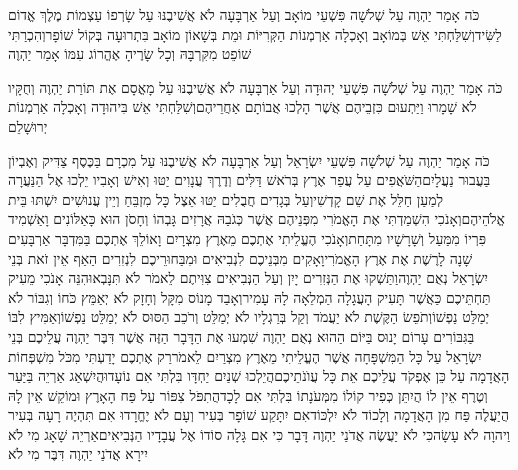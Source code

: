 \documentclass[../main/main.tex]{subfiles}
\begin{document}
\begin{multicols*}{\ncols}
כֹּה אָמַר יַהְוֶה עַל שְׁלֹשָׁה פִּשְׁעֵי מוֹאָב וְעַל אַרְבָּעָה לֹא אֲשִׁיבֶנּוּ עַל שָׂרְפוֹ עַצְמוֹת מֶלֶךְ אֱדוֹם לַשִּׂיד\PreVerseSpace{}וְשִׁלַּחְתִּי אֵשׁ בְּמוֹאָב וְאָכְלָה אַרְמְנוֹת הַקְּרִיּוֹת וּמֵת בְּשָׁאוֹן מוֹאָב בִּתְרוּעָה בְּקוֹל שׁוֹפָר\PreVerseSpace{}וְהִכְרַתִּי שׁוֹפֵט מִקִּרְבָּהּ וְכָל שָׂרֶיהָ אֶהֱרוֹג עִמּוֹ אָמַר יַהְוֶה\OpenSection{}\par
{}כֹּה אָמַר יַהְוֶה עַל שְׁלֹשָׁה פִּשְׁעֵי יְהוּדָה וְעַל אַרְבָּעָה לֹא אֲשִׁיבֶנּוּ עַל מָאֳסָם אֶת תּוֹרַת יַהְוֶה וְחֻקָּיו לֹא שָׁמָרוּ וַיַּתְעוּם כִּזְבֵיהֶם אֲשֶׁר הָלְכוּ אֲבוֹתָם אַחֲרֵיהֶם\PreVerseSpace{}וְשִׁלַּחְתִּי אֵשׁ בִּיהוּדָה וְאָכְלָה אַרְמְנוֹת יְרוּשָׁלֵם\OpenSection{}\par
{}כֹּה אָמַר יַהְוֶה עַל שְׁלֹשָׁה פִּשְׁעֵי יִשְׂרָאֵל וְעַל אַרְבָּעָה לֹא אֲשִׁיבֶנּוּ עַל מִכְרָם בַּכֶּסֶף צַדִּיק וְאֶבְיוֹן בַּעֲבוּר נַעֲלָיִם\PreVerseSpace{}הַשֹּׁאֲפִים עַל עֲפַר אֶרֶץ בְּרֹאשׁ דַּלִּים וְדֶרֶךְ עֲנָוִים יַטּוּ וְאִישׁ וְאָבִיו יֵלְכוּ אֶל הַנַּעֲרָה לְמַעַן חַלֵּל אֶת שֵׁם קָדְשִׁי\PreVerseSpace{}וְעַל בְּגָדִים חֲבֻלִים יַטּוּ אֵצֶל כָּל מִזְבֵּחַ וְיֵין עֲנוּשִׁים יִשְׁתּוּ בֵּית אֱלֹהֵיהֶם\PreVerseSpace{}וְאָנֹכִי הִשְׁמַדְתִּי אֶת הָאֱמֹרִי מִפְּנֵיהֶם אֲשֶׁר כְּגֹבַהּ אֲרָזִים גָּבְהוֹ וְחָסֹן הוּא כָּאַלּוֹנִים וָאַשְׁמִיד פִּרְיוֹ מִמַּעַל וְשָׁרָשָׁיו מִתָּחַת\PreVerseSpace{}וְאָנֹכִי הֶעֱלֵיתִי אֶתְכֶם מֵאֶרֶץ מִצְרָיִם וָאוֹלֵךְ אֶתְכֶם בַּמִּדְבָּר אַרְבָּעִים שָׁנָה לָרֶשֶׁת אֶת אֶרֶץ הָאֱמֹרִי\PreVerseSpace{}וָאָקִים מִבְּנֵיכֶם לִנְבִיאִים וּמִבַּחוּרֵיכֶם לִנְזִרִים הַאַף אֵין זֹאת בְּנֵי יִשְׂרָאֵל נְאֻם יַהְוֶה\PreVerseSpace{}וַתַּשְׁקוּ אֶת הַנְּזִרִים יָיִן וְעַל הַנְּבִיאִים צִוִּיתֶם לֵאמֹר לֹא תִּנָּבְאוּ\PreVerseSpace{}הִנֵּה אָנֹכִי מֵעִיק תַּחְתֵּיכֶם כַּאֲשֶׁר תָּעִיק הָעֲגָלָה הַמְלֵאָה לָהּ עָמִיר\PreVerseSpace{}וְאָבַד מָנוֹס מִקָּל וְחָזָק לֹא יְאַמֵּץ כֹּחוֹ וְגִבּוֹר לֹא יְמַלֵּט נַפְשׁוֹ\PreVerseSpace{}וְתֹפֵשׂ הַקֶּשֶׁת לֹא יַעֲמֹד וְקַל בְּרַגְלָיו לֹא יְמַלֵּט וְרֹכֵב הַסּוּס לֹא יְמַלֵּט נַפְשׁוֹ\PreVerseSpace{}וְאַמִּיץ לִבּוֹ בַּגִּבּוֹרִים עָרוֹם יָנוּס בַּיּוֹם הַהוּא נְאֻם יַהְוֶה \ClosedSection{}שִׁמְעוּ אֶת הַדָּבָר הַזֶּה אֲשֶׁר דִּבֶּר יַהְוֶה עֲלֵיכֶם בְּנֵי יִשְׂרָאֵל עַל כָּל הַמִּשְׁפָּחָה אֲשֶׁר הֶעֱלֵיתִי מֵאֶרֶץ מִצְרַיִם לֵאמֹר\PreVerseSpace{}רַק אֶתְכֶם יָדַעְתִּי מִכֹּל מִשְׁפְּחוֹת הָאֲדָמָה עַל כֵּן אֶפְקֹד עֲלֵיכֶם אֵת כָּל עֲוֺנֹתֵיכֶם\PreVerseSpace{}הֲיֵלְכוּ שְׁנַיִם יַחְדָּו בִּלְתִּי אִם נוֹעָדוּ\PreVerseSpace{}הֲיִשְׁאַג אַרְיֵה בַּיַּעַר וְטֶרֶף אֵין לוֹ הֲיִתֵּן כְּפִיר קוֹלוֹ מִמְּעֹנָתוֹ בִּלְתִּי אִם לָכָד\PreVerseSpace{}הֲתִפֹּל צִפּוֹר עַל פַּח הָאָרֶץ וּמוֹקֵשׁ אֵין לָהּ הֲיַעֲלֶה פַּח מִן הָאֲדָמָה וְלָכוֹד לֹא יִלְכּוֹד\PreVerseSpace{}אִם יִתָּקַע שׁוֹפָר בְּעִיר וְעָם לֹא יֶחֱרָדוּ אִם תִּהְיֶה רָעָה בְּעִיר וַיהוָה לֹא עָשָׂה\PreVerseSpace{}כִּי לֹא יַעֲשֶׂה אֲדֹנַי יַהְוֶה דָּבָר כִּי אִם גָּלָה סוֹדוֹ אֶל עֲבָדָיו הַנְּבִיאִים\PreVerseSpace{}אַרְיֵה שָׁאָג מִי לֹא יִירָא אֲדֹנַי יַהְוֶה דִּבֶּר מִי לֹא 
\end{multicols*}
\end{document}
